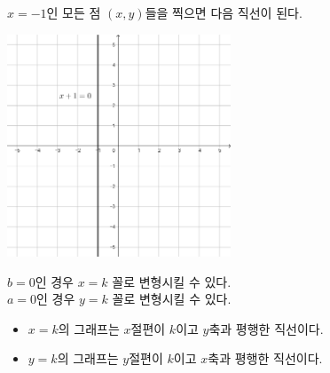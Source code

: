 \documentclass{oblivoir}
\begin{document}
\begin{enumerate}
\(x=-1\)인 모든 점 \((x,y)\)들을 찍으면 다음 직선이 된다.
\begin{center}
\includegraphics[width=0.5\textwidth]{line_5}
\end{center}
\end{enumerate}

\begin{mdframed}
\label{lline2}
\(b=0\)인 경우 \(x=k\) 꼴로 변형시킬 수 있다.\\
\(a=0\)인 경우 \(y=k\) 꼴로 변형시킬 수 있다.
\begin{itemize}
\item
\(x=k\)의 그래프는 \(x\)절편이 \(k\)이고 \(y\)축과 평행한 직선이다.
\item
\(y=k\)의 그래프는 \(y\)절편이 \(k\)이고 \(x\)축과 평행한 직선이다.
\end{itemize}
\end{mdframed}
\end{document}
